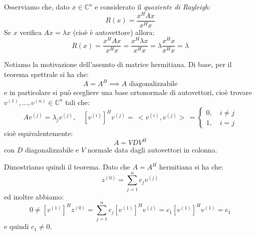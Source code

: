\documentclass[a4paper,11pt]{article}
\begin{document}
Osserviamo che, dato $x \in \mathbb{C}^n$ e considerato il \textit{quoziente di Rayleigh}:
$$
R(x) = \frac{x^H A x}{x^H x}
$$
Se $x$ verifica $Ax = \lambda x$ (cioè è autovettore) allora:
$$
R(x) = \frac{x^H A x}{x^H x} = \frac{x^H \lambda x}{x^H x} = \lambda \frac{x^H x}{x^H x} = \lambda
$$

Notiamo la motivazione dell'assunto di matrice hermitiana.
Di base, per il teorema spettrale si ha che:
$$
A = A^H \implies A \text{ diagonalizzabile}
$$
e in particolare si può scegliere una base ortonormale di autovettori, cioè trovare $v^{(1)}, ..., v^{(n)} \in \mathbb{C}^n$ tali che:
$$
A v^{(j)} = \lambda_j v^{(j)}, \quad \left[ v^{(i)} \right]^H v^{(j)} = \, < v^{(i)}, v^{(j)} > \, =
	\begin{cases}
		0, \quad i \neq j \\
		1, \quad i = j
	\end{cases}
$$
cioè equivalentemente:
$$
A = V D V^H
$$
con $D$ diagonalizzabile e $V$ normale data dagli autovettori in colonna.

\par\smallskip

Dimostriamo quindi il teorema.
Dato che $A = A^H$ hermitiana si ha che:
$$
z^{(0)} = \sum_{j = 1}^n c_j v^{(j)} 
$$
ed inoltre abbiamo:
$$
0 \neq \left[ v^{(1)} \right]^H z^{(0)} = \sum_{j = 1}^n c_j \left[ v^{(1)} \right]^H v^{(j)} = c_1 \left[ v^{(1)} \right]^H v^{(1)} = c_1
$$
e quindi $c_1 \neq 0$.
\end{document}
